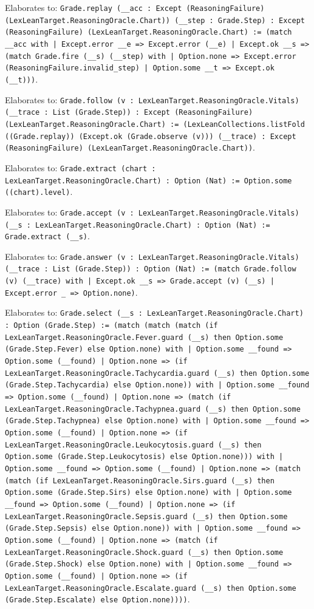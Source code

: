 \documentclass[11pt]{article}
\begin{document}
\noindent Elaborates to: \texttt{Grade.replay (\_\_acc : Except (ReasoningFailure) (LexLeanTarget.ReasoningOracle.Chart)) (\_\_step : Grade.Step) : Except (ReasoningFailure) (LexLeanTarget.ReasoningOracle.Chart) := (match \_\_acc with | Except.error \_\_e => Except.error (\_\_e) | Except.ok \_\_s => (match Grade.fire (\_\_s) (\_\_step) with | Option.none => Except.error (ReasoningFailure.invalid\_step) | Option.some \_\_t => Except.ok (\_\_t)))}.\par
\noindent Elaborates to: \texttt{Grade.follow (v : LexLeanTarget.ReasoningOracle.Vitals) (\_\_trace : List (Grade.Step)) : Except (ReasoningFailure) (LexLeanTarget.ReasoningOracle.Chart) := (LexLeanCollections.listFold ((Grade.replay)) (Except.ok (Grade.observe (v))) (\_\_trace) : Except (ReasoningFailure) (LexLeanTarget.ReasoningOracle.Chart))}.\par
\noindent Elaborates to: \texttt{Grade.extract (chart : LexLeanTarget.ReasoningOracle.Chart) : Option (Nat) := Option.some ((chart).level)}.\par
\noindent Elaborates to: \texttt{Grade.accept (v : LexLeanTarget.ReasoningOracle.Vitals) (\_\_s : LexLeanTarget.ReasoningOracle.Chart) : Option (Nat) := Grade.extract (\_\_s)}.\par
\noindent Elaborates to: \texttt{Grade.answer (v : LexLeanTarget.ReasoningOracle.Vitals) (\_\_trace : List (Grade.Step)) : Option (Nat) := (match Grade.follow (v) (\_\_trace) with | Except.ok \_\_s => Grade.accept (v) (\_\_s) | Except.error \_ => Option.none)}.\par
\noindent Elaborates to: \texttt{Grade.select (\_\_s : LexLeanTarget.ReasoningOracle.Chart) : Option (Grade.Step) := (match (match (match (if LexLeanTarget.ReasoningOracle.Fever.guard (\_\_s) then Option.some (Grade.Step.Fever) else Option.none) with | Option.some \_\_found => Option.some (\_\_found) | Option.none => (if LexLeanTarget.ReasoningOracle.Tachycardia.guard (\_\_s) then Option.some (Grade.Step.Tachycardia) else Option.none)) with | Option.some \_\_found => Option.some (\_\_found) | Option.none => (match (if LexLeanTarget.ReasoningOracle.Tachypnea.guard (\_\_s) then Option.some (Grade.Step.Tachypnea) else Option.none) with | Option.some \_\_found => Option.some (\_\_found) | Option.none => (if LexLeanTarget.ReasoningOracle.Leukocytosis.guard (\_\_s) then Option.some (Grade.Step.Leukocytosis) else Option.none))) with | Option.some \_\_found => Option.some (\_\_found) | Option.none => (match (match (if LexLeanTarget.ReasoningOracle.Sirs.guard (\_\_s) then Option.some (Grade.Step.Sirs) else Option.none) with | Option.some \_\_found => Option.some (\_\_found) | Option.none => (if LexLeanTarget.ReasoningOracle.Sepsis.guard (\_\_s) then Option.some (Grade.Step.Sepsis) else Option.none)) with | Option.some \_\_found => Option.some (\_\_found) | Option.none => (match (if LexLeanTarget.ReasoningOracle.Shock.guard (\_\_s) then Option.some (Grade.Step.Shock) else Option.none) with | Option.some \_\_found => Option.some (\_\_found) | Option.none => (if LexLeanTarget.ReasoningOracle.Escalate.guard (\_\_s) then Option.some (Grade.Step.Escalate) else Option.none))))}.\par
\end{document}
